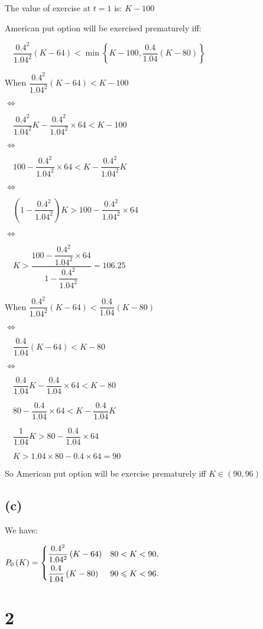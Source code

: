 \documentclass{article}
\begin{document}
The value of exercise at $t=1$ is: $K-100$

American put option will be exercised prematurely iff:

$\quad\dfrac{0.4^{2}}{1.04^{2}}\left(K-64\right)<\min \left\{ K-100, \dfrac{0.4}{1.04}\left(K-80\right) \right\}$

When $\dfrac{0.4^{2}}{1.04^{2}}\left(K-64\right)<K-100$

$\iff$

$\quad \dfrac{0.4^{2}}{1.04^{2}}K-\dfrac{0.4^{2}}{1.04^{2}}\times64<K-100$

$\iff$

$\quad 100-\dfrac{0.4^{2}}{1.04^{2}}\times64<K-\dfrac{0.4^{2}}{1.04^{2}}K$

$\iff$

$\quad \left(1-\dfrac{0.4^{2}}{1.04^{2}}\right)K>100-\dfrac{0.4^{2}}{1.04^{2}}\times64$

$\iff$

$\quad K>\dfrac{100-\dfrac{0.4^{2}}{1.04^{2}}\times64}{1-\dfrac{0.4^{2}}{1.04^{2}}}=106.25$

When $\dfrac{0.4^{2}}{1.04^{2}}\left(K-64\right)<\dfrac{0.4}{1.04}\left(K-80\right)$

$\iff$

$\quad\dfrac{0.4}{1.04}\left(K-64\right)<K-80$

$\iff$

$\quad\dfrac{0.4}{1.04}K-\dfrac{0.4}{1.04}\times64<K-80$

$\quad80-\dfrac{0.4}{1.04}\times64<K-\dfrac{0.4}{1.04}K$

$\quad\dfrac{1}{1.04}K>80-\dfrac{0.4}{1.04}\times64$

$\quad K>1.04\times80-0.4\times64=90$

So American put option will be exercise prematurely iff $K\in\left(90,96\right)$

\subsection*{(c)}

We have:

$P_{0}\left(K\right)=\begin{dcases}
    \dfrac{0.4^{2}}{1.04^{2}}\left(K-64\right) & 80<K<90, \\
    \dfrac{0.4}{1.04}\left(K-80\right) & 90\leqslant K<96.\\
\end{dcases}$

\section*{2}
\end{document}

